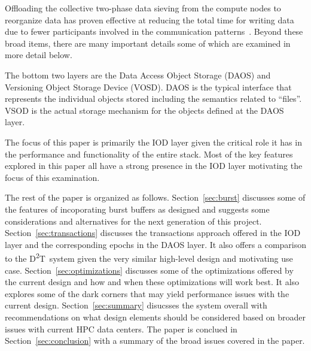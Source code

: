 \documentclass[conference]{sig-alt-gov2}
\newcommand{\DDT}{D\textsuperscript{2}T~}
\begin{document}
Offloading the collective two-phase data sieving from the compute nodes to
reorganize data has proven effective at reducing the total time for writing
data due to fewer participants involved in the communication
patterns~\cite{lofstead:2011:nessie-staging}.  Beyond these broad items, there
are many important details some of which are examined in more detail below.

The bottom two layers are the Data Access Object Storage (DAOS) and Versioning
Object Storage Device (VOSD). DAOS is the typical interface that represents
the individual objects stored including the semantics related to ``files''.
VSOD is the actual storage mechanism for the objects defined at the DAOS layer.

The focus of this paper is primarily the IOD layer given the critical role it
has in the performance and functionality of the entire stack. Most of the key
features explored in this paper all have a strong presence in the IOD layer
motivating the focus of this examination.



The rest of the paper is organized as follows. Section~\ref{sec:burst}
discusses some of the features of incoporating burst buffers as designed and
suggests some considerations and alternatives for the next generation of this
project. Section~\ref{sec:transactions} discusses the transactions approach
offered in the IOD layer and the corresponding epochs in the DAOS layer. It
also offers a comparison to the \DDT system given the very similar high-level
design and motivating use case.  Section~\ref{sec:optimizations} discusses some
of the optimizations offered by the current design and how and when these
optimizations will work best. It also explores some of the dark corners that
may yield performance issues with the current design. 
Section~\ref{sec:summary} disucsses the system overall with recommendations on
what design elements should be considered based on broader issues with current
HPC data centers. The paper is conclued in Section~\ref{sec:conclusion} with
a summary of the broad issues covered in the paper.
\end{document}
